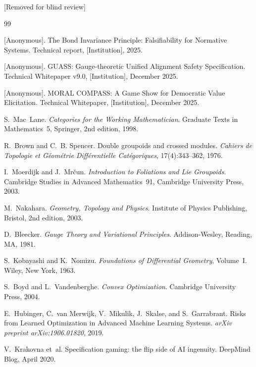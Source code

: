 \documentclass[12pt]{article}
\begin{document}
[Removed for blind review]

\begin{thebibliography}{99}

[Anonymous].
\newblock The Bond Invariance Principle: Falsifiability for Normative Systems.
\newblock Technical report, [Institution], 2025.

[Anonymous].
\newblock GUASS: Gauge-theoretic Unified Alignment Safety Specification.
\newblock Technical Whitepaper v9.0, [Institution], December 2025.

[Anonymous].
\newblock MORAL COMPASS: A Game Show for Democratic Value Elicitation.
\newblock Technical Whitepaper, [Institution], December 2025.

S.~Mac~Lane.
\newblock \emph{Categories for the Working Mathematician}.
\newblock Graduate Texts in Mathematics~5, Springer, 2nd edition, 1998.

R.~Brown and C.~B. Spencer.
\newblock Double groupoids and crossed modules.
\newblock \emph{Cahiers de Topologie et G\'{e}om\'{e}trie Diff\'{e}rentielle Cat\'{e}goriques}, 17(4):343--362, 1976.

I.~Moerdijk and J.~Mr\v{c}un.
\newblock \emph{Introduction to Foliations and Lie Groupoids}.
\newblock Cambridge Studies in Advanced Mathematics~91, Cambridge University Press, 2003.

M.~Nakahara.
\newblock \emph{Geometry, Topology and Physics}.
\newblock Institute of Physics Publishing, Bristol, 2nd edition, 2003.

D.~Bleecker.
\newblock \emph{Gauge Theory and Variational Principles}.
\newblock Addison-Wesley, Reading, MA, 1981.

S.~Kobayashi and K.~Nomizu.
\newblock \emph{Foundations of Differential Geometry}, Volume~I.
\newblock Wiley, New York, 1963.

S.~Boyd and L.~Vandenberghe.
\newblock \emph{Convex Optimization}.
\newblock Cambridge University Press, 2004.

E.~Hubinger, C.~van Merwijk, V.~Mikulik, J.~Skalse, and S.~Garrabrant.
\newblock Risks from Learned Optimization in Advanced Machine Learning Systems.
\newblock \emph{arXiv preprint arXiv:1906.01820}, 2019.

V.~Krakovna et~al.
\newblock Specification gaming: the flip side of AI ingenuity.
\newblock DeepMind Blog, April 2020.


\end{thebibliography}
\end{document}
